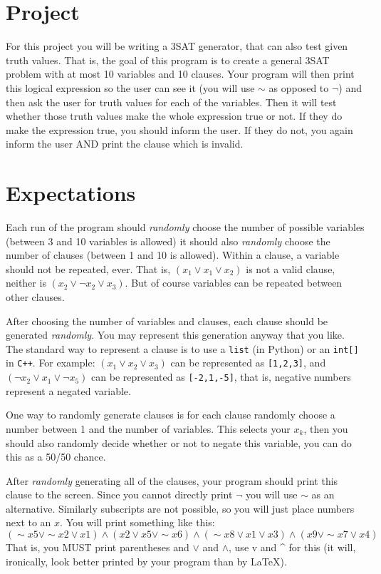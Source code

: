 \documentclass{article}
\begin{document}
\section{Project}
For this project you will be writing a 3SAT generator, that can also test given
truth values. That is, the goal of this program is to create a general 3SAT
problem with at most 10 variables and 10 clauses. Your program will then print
this logical expression so the user can see it (you will use $\sim$ as opposed
to $\neg$) and then ask the user for truth values for each of the variables.
Then it will test whether those truth values make the whole expression true or
not. If they do make the expression true, you should inform the user. If they do
not, you again inform the user AND print the clause which is invalid.

\section{Expectations}
Each run of the program should \emph{randomly} choose the number of possible
variables (between 3 and 10 variables is allowed) it should also \emph{randomly}
choose the number of clauses (between 1 and 10 is allowed). Within a clause, a
variable should not be repeated, ever. That is, $(x_1 \vee x_1 \vee x_2)$ is not
a valid clause, neither is $(x_2\vee \neg x_2 \vee x_3)$. But of course
variables can be repeated between other clauses.

After choosing the number of variables and clauses, each clause should be
generated \emph{randomly}. You may represent this generation anyway that you
like. The standard way to represent a clause is to use a \texttt{list} (in
Python) or an \texttt{int[]} in \texttt{C++}. For example: $(x_1\vee x_2 \vee
x_3)$ can be represented as \texttt{[1,2,3]}, and $(\neg x_2 \vee x_1 \vee \neg
x_5)$ can be represented as \texttt{[-2,1,-5]}, that is, negative numbers
represent a negated variable.

One way to randomly generate clauses is for each clause randomly choose a number
between 1 and the number of variables. This selects your $x_k$, then you should
also randomly decide whether or not to negate this variable, you can do this as
a 50/50 chance.

After \emph{randomly} generating all of the clauses, your program should print
this clause to the screen. Since you cannot directly print $\neg$ you will use
$\sim$ as an alternative. Similarly subscripts are not possible, so you will
just place numbers next to an $x$. You will print something like this:
\[
  (\sim x5 \vee \sim x2 \vee x1) \wedge (x2 \vee x5 \vee \sim x6) \wedge (\sim
  x8 \vee x1 \vee x3) \wedge (x9 \vee \sim x7 \vee x4)
\]
That is, you MUST print parentheses and $\vee$ and $\wedge$, use v and \^{} for
this (it will, ironically, look better printed by your program than by \LaTeX).
\end{document}
